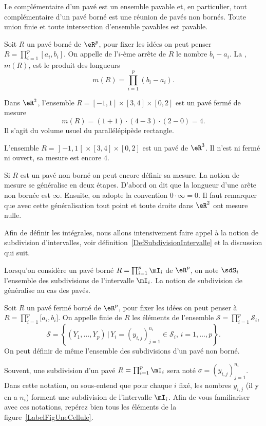 Le complémentaire d'un pavé est  un ensemble pavable et, en particulier, tout complémentaire d'un pavé borné est une réunion de  pavés non bornés. Toute union finie et toute intersection d'ensemble pavables est pavable.
\begin{definition}
	Soit \( R\) un pavé borné de \( \eR^p\), pour fixer les idées on peut penser \( R=\prod_{i=1}^{p}[a_i,b_i]\). On appelle  de l'\( i\)-ème arrête de \( R\) le nombre \( b_i-a_i\). La , \( m(R)\), est le produit des longueurs
	\[
		m(R)=\prod_{i=1}^{p}(b_i-a_i).
	\]
\end{definition}
\begin{example}
	Dans \( \eR^3\), l'ensemble \( R=[-1,1]\times[3,4]\times[0,2]\) est un pavé fermé de mesure
	\[
		m(R)= (1+1)\cdot(4-3)\cdot(2-0)=4.
	\]
	Il s'agit du volume usuel du parallélépipède rectangle.
\end{example}

\begin{example}
	L'ensemble \( R=\mathopen] -1 , 1 \mathclose[\times[3,4]\times[0,2]\) est un pavé de \( \eR^3\). Il n'est ni fermé ni ouvert, sa mesure est encore \( 4\).
\end{example}

Si \( R\) est un pavé non borné on peut encore définir sa mesure. La notion de mesure se généralise en deux étapes. D'abord on dit que la longueur d'une arête non bornée est \( \infty\). Ensuite, on adopte la convention \( 0\cdot \infty=0\). Il faut remarquer que avec cette généralisation tout point et toute droite dans \( \eR^2\) ont mesure nulle.

Afin de définir les intégrales, nous allons intensivement faire appel à la notion de subdivision d'intervalles, voir définition~\ref{DefSubdivisionIntervalle} et la discussion qui suit.

Lorsqu'on considère un pavé borné \( R=\prod_{i=1}^p\mI_i\) de \( \eR^p\), on note \( \sdS_i\) l'ensemble des subdivisions de l'intervalle \( \mI_i\). La notion de subdivision de généralise au cas des pavés.
\begin{definition}
	Soit \( R\) un pavé fermé borné de \( \eR^p\), pour fixer les idées on peut penser à \( R=\prod_{i=1}^p\mathopen[ a_i , b_i \mathclose]\). On appelle  finie de \( R\) les éléments de l'ensemble \( \mathcal{S}=\prod_{i=1}^{p}\mathcal{S}_i\),
	\[
		\mathcal{S}=\left\{ (Y_{1},\ldots, Y_{p})\,\big\vert\, Y_{i}=(y_{i,j})_{j=1}^{n_i}\in\mathcal{S}_i,\, i=1,\ldots,p\right\}.
	\]
	On peut définir de même l'ensemble des subdivisions d'un pavé non borné.
\end{definition}
Souvent, une subdivision d'un pavé \( R=\prod_{i=1}^p\mI_i\) sera noté \( \sigma=(y_{i,j})_{j=1}^{n_i}\). Dans cette notation, on sous-entend que pour chaque \( i\) fixé, les nombres \( y_{i,j}\) (il y en a \( n_i\)) forment une subdivision de l'intervalle \( \mI_i\). Afin de vous familiariser avec ces notations, repérez bien tous les éléments de la figure~\ref{LabelFigUneCellule}.
\newcommand{\CaptionFigUneCellule}{Une cellule d'une subdivision d'un pavé de \( \eR^2\). La cellule grisée est \( R_{(4,2)}\).}


